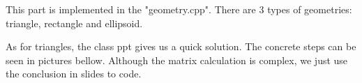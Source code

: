 \documentclass[acmtog]{acmart}
\begin{document}
\quad This part is implemented in the "geometry.cpp". 
There are 3 types of geometries: triangle, rectangle and ellipsoid.

As for triangles, the class ppt gives us a quick solution. The concrete steps can be seen in pictures bellow. 
Although the matrix calculation is complex, we just use the conclusion in slides to code.

\end{document}
